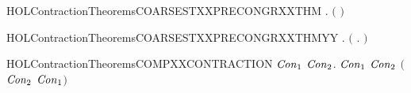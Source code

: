 \newcommand{\HOLContractionTheoremsCOARSESTXXPRECONGRXXRL}{\UseVerbatim{HOLContractionTheoremsCOARSESTXXPRECONGRXXRL}}
\begin{SaveVerbatim}{HOLContractionTheoremsCOARSESTXXPRECONGRXXTHM}
\HOLTokenTurnstile{} \HOLSymConst{\HOLTokenForall{}} .
       \HOLSymConst{\HOLTokenConj{}}   \HOLSymConst{\HOLTokenImp{}}
     \ensuremath{(}   \HOLSymConst{\HOLTokenEquiv{}}   \ensuremath{)}
\end{SaveVerbatim}
\newcommand{\HOLContractionTheoremsCOARSESTXXPRECONGRXXTHM}{\UseVerbatim{HOLContractionTheoremsCOARSESTXXPRECONGRXXTHM}}
\begin{SaveVerbatim}{HOLContractionTheoremsCOARSESTXXPRECONGRXXTHMYY}
\HOLTokenTurnstile{} \HOLSymConst{\HOLTokenForall{}} .
       \HOLSymConst{\HOLTokenConj{}}   \HOLSymConst{\HOLTokenImp{}}
     \ensuremath{(}   \HOLSymConst{\HOLTokenEquiv{}} \HOLSymConst{\HOLTokenForall{}}.  \HOLSymConst{\ensuremath{+}}    \HOLSymConst{\ensuremath{+}} \ensuremath{)}
\end{SaveVerbatim}
\newcommand{\HOLContractionTheoremsCOARSESTXXPRECONGRXXTHMYY}{\UseVerbatim{HOLContractionTheoremsCOARSESTXXPRECONGRXXTHMYY}}
\begin{SaveVerbatim}{HOLContractionTheoremsCOMPXXCONTRACTION}
\HOLTokenTurnstile{} \HOLSymConst{\HOLTokenForall{}}\ensuremath{\HOLBoundVar{Con}\sb{\mathrm{1}}} \ensuremath{\HOLBoundVar{Con}\sb{\mathrm{2}}}.
      \ensuremath{\HOLBoundVar{Con}\sb{\mathrm{1}}} \HOLSymConst{\HOLTokenConj{}}  \ensuremath{\HOLBoundVar{Con}\sb{\mathrm{2}}} \HOLSymConst{\HOLTokenImp{}}
      \ensuremath{(}\ensuremath{\HOLBoundVar{Con}\sb{\mathrm{2}}}  \ensuremath{\HOLBoundVar{Con}\sb{\mathrm{1}}}\ensuremath{)}
\end{SaveVerbatim}
\newcommand{\HOLContractionTheoremsCOMPXXCONTRACTION}{\UseVerbatim{HOLContractionTheoremsCOMPXXCONTRACTION}}
